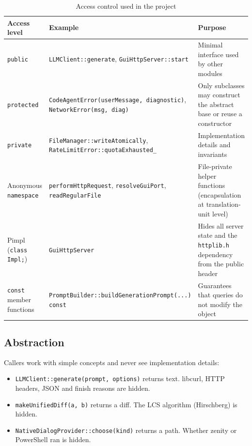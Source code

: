 \documentclass[12pt,a4paper,oneside]{book}
\begin{document}
\begin{table}[htbp]
\centering\small
\begin{tabular}{|p{3.3cm}|p{4.8cm}|p{5.9cm}|}
\hline
\textbf{Access level} & \textbf{Example} & \textbf{Purpose} \\ \hline
\texttt{public} & \texttt{LLMClient::\allowbreak{}generate}, \texttt{GuiHttpServer::\allowbreak{}start} & Minimal interface used by other modules \\ \hline
\texttt{protected} & \texttt{CodeAgentError(\allowbreak{}userMessage, diagnostic)}, \texttt{NetworkError(msg, diag)} & Only subclasses may construct the abstract base or reuse a constructor \\ \hline
\texttt{private} & \texttt{FileManager::\allowbreak{}writeAtomically}, \texttt{RateLimitError::\allowbreak{}quotaExhausted\_} & Implementation details and invariants \\ \hline
Anonymous \texttt{namespace} & \texttt{performHttpRequest}, \texttt{resolveGuiPort}, \texttt{readRegularFile} & File-private helper functions (encapsulation at translation-unit level) \\ \hline
Pimpl (\texttt{class Impl;}) & \texttt{GuiHttpServer} & Hides all server state and the \texttt{httplib.h} dependency from the public header \\ \hline
\texttt{const} member functions & \texttt{PromptBuilder::\allowbreak{}build\allowbreak{}GenerationPrompt(...) const} & Guarantees that queries do not modify the object \\ \hline
\end{tabular}
\caption{Access control used in the project}
\label{tab:ca-access}
\end{table}

\subsection{Abstraction}
Callers work with simple concepts and never see implementation details:
\begin{itemize}
  \item \texttt{LLMClient::\allowbreak{}generate(prompt, options)} returns text. libcurl,
    HTTP headers, JSON and finish reasons are hidden.
  \item \texttt{makeUnifiedDiff(a, b)} returns a diff. The LCS algorithm
    (Hirschberg) is hidden.
  \item \texttt{NativeDialogProvider::\allowbreak{}choose(kind)} returns a path. Whether
    zenity or PowerShell ran is hidden.
\end{itemize}
\end{document}

